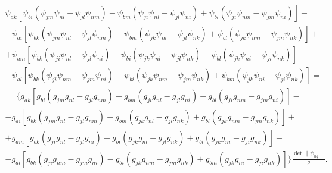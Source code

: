 \begin{multline}


\psi_{ak}[\psi_{bi}(\psi_{jm}\psi_{nl}-\psi_{jl}\psi_{nm})


-\psi_{bm}(\psi_{ji}\psi_{nl}-\psi_{jl}\psi_{ni})+


\psi_{bl}(\psi_{ji}\psi_{nm}-\psi_{jm}\psi_{ni})]- \\


%


-\psi_{ai}[\psi_{bk}(\psi_{jm}\psi_{nl}-\psi_{jl}\psi_{nm})


-\psi_{bm}(\psi_{jk}\psi_{nl}-\psi_{jl}\psi_{nk})+


\psi_{bl}(\psi_{jk}\psi_{nm}-\psi_{jm}\psi_{nk})]+ \\


%


+\psi_{am}[\psi_{bk}(\psi_{ji}\psi_{nl}-\psi_{jl}\psi_{ni})-


\psi_{bi}(\psi_{jk}\psi_{nl}-\psi_{jl}\psi_{nk})+


\psi_{bl}(\psi_{jk}\psi_{ni}-\psi_{ji}\psi_{nk})]- \\


%


-\psi_{al}[\psi_{bk}(\psi_{ji}\psi_{nm}-\psi_{jm}\psi_{ni})


-\psi_{bi}(\psi_{jk}\psi_{nm}-\psi_{jm}\psi_{nk})+


\psi_{bm}(\psi_{jk}\psi_{ni}-\psi_{ji}\psi_{nk})]= \\


%


=\Big\{g_{ak}[g_{bi}(g_{jm}g_{nl}-g_{jl}g_{nm})


-g_{bm}(g_{ji}g_{nl}-g_{jl}g_{ni})+g_{bl}(g_{ji}g_{nm}-g_{jm}g_{ni})]- \\


%


-g_{ai}[g_{bk}(g_{jm}g_{nl}-g_{jl}g_{nm})


-g_{bm}(g_{jk}g_{nl}-g_{jl}g_{nk})+


g_{bl}(g_{jk}g_{nm}-g_{jm}g_{nk})]+ \\


%


+g_{am}[g_{bk}(g_{ji}g_{nl}-g_{jl}g_{ni})


-g_{bi}(g_{jk}g_{nl}-g_{jl}g_{nk})


+g_{bl}(g_{jk}g_{ni}-g_{ji}g_{nk})]- \\


%


-g_{al}[g_{bk}(g_{ji}g_{nm}-g_{jm}g_{ni})


-g_{bi}(g_{jk}g_{nm}-g_{jm}g_{nk})+


g_{bm}(g_{jk}g_{ni}-


g_{ji}g_{nk})]\Big\}\frac{\det\|\psi_{hq}\|}{g}.


\end{multline}


